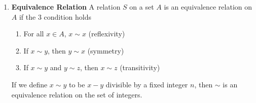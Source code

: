 \documentclass[11pt]{article}
\begin{document}
\begin{defn*}
\begin{enumerate}
        \item \textbf{Equivalence Relation} A relation $S$ on a set $A$ is an equivalence relation on $A$ if the 3 condition holds 
        \begin{enumerate}
            \item For all $x\in A$, $x\sim x$ (reflexivity)
            \item If $x\sim y$, then $y\sim x$ (symmetry)
            \item If $x\sim y$ and $y\sim z$, then $x\sim z$ (transitivity)
        \end{enumerate}
        If we define $x\sim y$ to be $x-y$ divisible by a fixed integer $n$, then $\sim$ is an equivalence relation on the set of integers.
    \end{enumerate}
\end{defn*}




\end{document}
